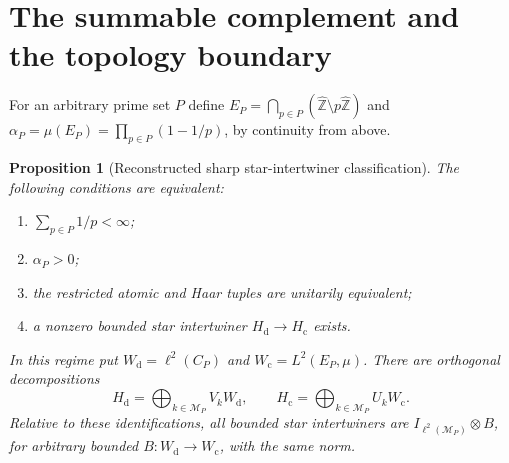 \documentclass[11pt]{article}
\newtheorem{proposition}[theorem]{Proposition}
\theoremstyle{remark}
\newcommand{\Zhat}{\widehat{\mathbb Z}}
\newcommand{\Hd}{H_{\mathrm d}}
\newcommand{\Hc}{H_{\mathrm c}}
\begin{document}
\section{The summable complement and the topology boundary}

For an arbitrary prime set $P$ define
$E_P=\bigcap_{p\in P}(\Zhat\setminus p\Zhat)$ and
$\alpha_P=\mu(E_P)=\prod_{p\in P}(1-1/p)$, by continuity from above.

\begin{proposition}[Reconstructed sharp star-intertwiner classification]\label{prop:boundary}
The following conditions are equivalent:
\begin{enumerate}
\item $\sum_{p\in P}1/p<\infty$;
\item $\alpha_P>0$;
\item the restricted atomic and Haar tuples are unitarily equivalent;
\item a nonzero bounded star intertwiner $\Hd\to\Hc$ exists.
\end{enumerate}
In this regime put $W_{\mathrm d}=\ell^2(C_P)$ and
$W_{\mathrm c}=L^2(E_P,\mu)$.  There are orthogonal decompositions
\begin{equation}\label{eq:wold}
 \Hd=\bigoplus_{k\in\mathcal M_P}V_kW_{\mathrm d},\qquad
 \Hc=\bigoplus_{k\in\mathcal M_P}U_kW_{\mathrm c}.
\end{equation}
Relative to these identifications, all bounded star intertwiners are
$I_{\ell^2(\mathcal M_P)}\otimes B$, for arbitrary bounded
$B:W_{\mathrm d}\to W_{\mathrm c}$, with the same norm.
\end{proposition}
\end{document}
